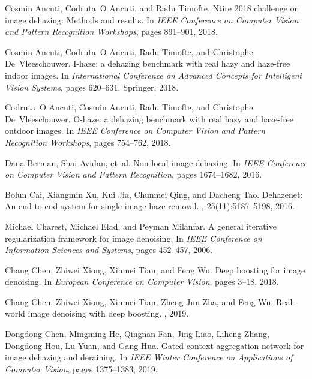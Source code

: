 \documentclass[10pt,twocolumn,letterpaper]{article}
\begin{document}
 



\small
\begin{thebibliography}{10}\itemsep=-1pt

Cosmin Ancuti, Codruta~O Ancuti, and Radu Timofte.
\newblock Ntire 2018 challenge on image dehazing: Methods and results.
\newblock In {\em IEEE Conference on Computer Vision and Pattern Recognition
  Workshops}, pages 891--901, 2018.

Cosmin Ancuti, Codruta~O Ancuti, Radu Timofte, and Christophe De~Vleeschouwer.
\newblock I-haze: a dehazing benchmark with real hazy and haze-free indoor
  images.
\newblock In {\em International Conference on Advanced Concepts for Intelligent
  Vision Systems}, pages 620--631. Springer, 2018.

Codruta~O Ancuti, Cosmin Ancuti, Radu Timofte, and Christophe De~Vleeschouwer.
\newblock O-haze: a dehazing benchmark with real hazy and haze-free outdoor
  images.
\newblock In {\em IEEE Conference on Computer Vision and Pattern Recognition
  Workshops}, pages 754--762, 2018.

Dana Berman, Shai Avidan, et~al.
\newblock Non-local image dehazing.
\newblock In {\em IEEE Conference on Computer Vision and Pattern Recognition},
  pages 1674--1682, 2016.

Bolun Cai, Xiangmin Xu, Kui Jia, Chunmei Qing, and Dacheng Tao.
\newblock Dehazenet: An end-to-end system for single image haze removal.
, 25(11):5187--5198, 2016.

Michael Charest, Michael Elad, and Peyman Milanfar.
\newblock A general iterative regularization framework for image denoising.
\newblock In {\em IEEE Conference on Information Sciences and Systems}, pages
  452--457, 2006.

Chang Chen, Zhiwei Xiong, Xinmei Tian, and Feng Wu.
\newblock Deep boosting for image denoising.
\newblock In {\em European Conference on Computer Vision}, pages 3--18, 2018.

Chang Chen, Zhiwei Xiong, Xinmei Tian, Zheng-Jun Zha, and Feng Wu.
\newblock Real-world image denoising with deep boosting.
,
  2019.

Dongdong Chen, Mingming He, Qingnan Fan, Jing Liao, Liheng Zhang, Dongdong Hou,
  Lu Yuan, and Gang Hua.
\newblock Gated context aggregation network for image dehazing and deraining.
\newblock In {\em IEEE Winter Conference on Applications of Computer Vision},
  pages 1375--1383, 2019.


\end{thebibliography}
\end{document}
